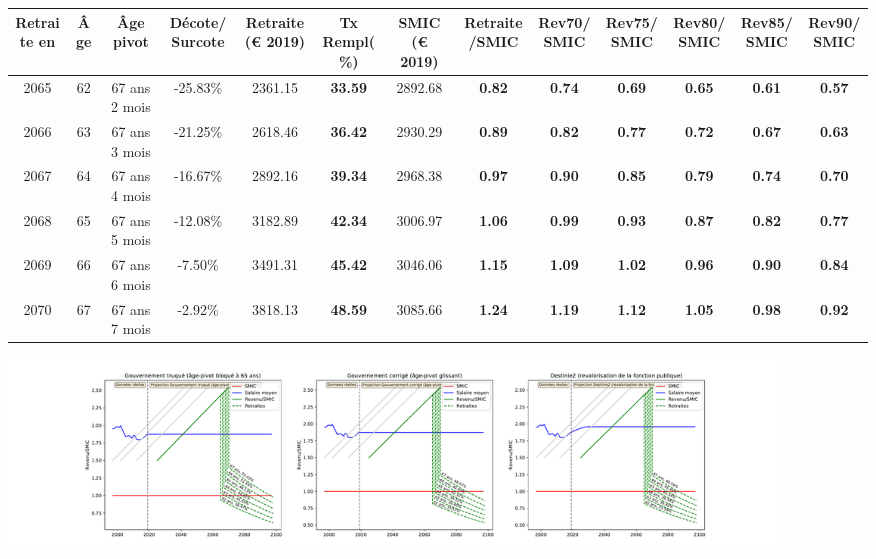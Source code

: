 { \scriptsize \begin{center} 
\begin{tabular}[htb]{|c|c||c|c||c|c||c||c|c|c|c|c|c|} 
\hline 
 Retraite en &  Âge &  Âge pivot &  Décote/Surcote &  Retraite (\euro{} 2019) &  Tx Rempl(\%) &  SMIC (\euro{} 2019) &  Retraite/SMIC &  Rev70/SMIC &  Rev75/SMIC &  Rev80/SMIC &  Rev85/SMIC &  Rev90/SMIC \\ 
\hline \hline 
 2065 &  62 &  67 ans 2 mois &  -25.83\% &  2361.15 &  {\bf 33.59} &  2892.68 &  {\bf {\color{red} 0.82}} &  {\bf {\color{red} 0.74}} &  {\bf {\color{red} 0.69}} &  {\bf {\color{red} 0.65}} &  {\bf {\color{red} 0.61}} &  {\bf {\color{red} 0.57}} \\ 
\hline 
 2066 &  63 &  67 ans 3 mois &  -21.25\% &  2618.46 &  {\bf 36.42} &  2930.29 &  {\bf {\color{red} 0.89}} &  {\bf {\color{red} 0.82}} &  {\bf {\color{red} 0.77}} &  {\bf {\color{red} 0.72}} &  {\bf {\color{red} 0.67}} &  {\bf {\color{red} 0.63}} \\ 
\hline 
 2067 &  64 &  67 ans 4 mois &  -16.67\% &  2892.16 &  {\bf 39.34} &  2968.38 &  {\bf {\color{red} 0.97}} &  {\bf {\color{red} 0.90}} &  {\bf {\color{red} 0.85}} &  {\bf {\color{red} 0.79}} &  {\bf {\color{red} 0.74}} &  {\bf {\color{red} 0.70}} \\ 
\hline 
 2068 &  65 &  67 ans 5 mois &  -12.08\% &  3182.89 &  {\bf 42.34} &  3006.97 &  {\bf 1.06} &  {\bf {\color{red} 0.99}} &  {\bf {\color{red} 0.93}} &  {\bf {\color{red} 0.87}} &  {\bf {\color{red} 0.82}} &  {\bf {\color{red} 0.77}} \\ 
\hline 
 2069 &  66 &  67 ans 6 mois &  -7.50\% &  3491.31 &  {\bf 45.42} &  3046.06 &  {\bf 1.15} &  {\bf 1.09} &  {\bf 1.02} &  {\bf {\color{red} 0.96}} &  {\bf {\color{red} 0.90}} &  {\bf {\color{red} 0.84}} \\ 
\hline 
 2070 &  67 &  67 ans 7 mois &  -2.92\% &  3818.13 &  {\bf 48.59} &  3085.66 &  {\bf 1.24} &  {\bf 1.19} &  {\bf 1.12} &  {\bf 1.05} &  {\bf {\color{red} 0.98}} &  {\bf {\color{red} 0.92}} \\ 
\hline 
\hline 
\end{tabular} 
\end{center} } 

 \begin{center}\includegraphics[width=0.9\textwidth]{fig/Ascendant1525_2003_22_dest_retraite.pdf}\end{center} \label{fig/Ascendant1525_2003_22_dest_retraite.pdf} 

